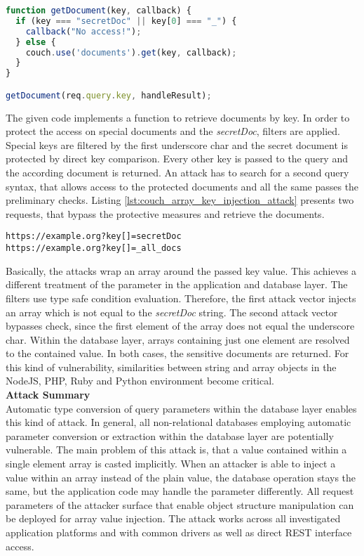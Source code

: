 \begin{lstlisting}[caption={Vulnerable NodeJS example for array key injection on CouchDB}, label={lst:couch_array_key_injection}, language=JavaScript]
function getDocument(key, callback) {
  if (key === "secretDoc" || key[0] === "_") {
    callback("No access!");
  } else {
    couch.use('documents').get(key, callback);
  }
}

getDocument(req.query.key, handleResult);
\end{lstlisting}

The given code implements a function to retrieve documents by key. In order to protect the access on special documents and the \emph{secretDoc}, filters are applied. Special keys are filtered by the first underscore char and the secret document is protected by direct key comparison. Every other key is passed to the query and the according document is returned. An attack has to search for a second query syntax, that allows access to the protected documents and all the same passes the preliminary checks. Listing \ref{lst:couch_array_key_injection_attack} presents two requests, that bypass the protective measures and retrieve the documents. \\

\begin{lstlisting}[caption={Attack vectors on CouchDB for array key injection via the query-string parameter}, label={lst:couch_array_key_injection_attack}]
https://example.org?key[]=secretDoc
https://example.org?key[]=_all_docs
\end{lstlisting}

Basically, the attacks wrap an array around the passed key value. This achieves a different treatment of the parameter in the application and database layer. The filters use type safe condition evaluation. Therefore, the first attack vector injects an array which is not equal to the \emph{secretDoc} string. The second attack vector bypasses check, since the first element of the array does not equal the underscore char. Within the database layer, arrays containing just one element are resolved to the contained value. In both cases, the sensitive documents are returned. For this kind of vulnerability, similarities between string and array objects in the NodeJS, PHP, Ruby and Python environment become critical. \\

\textbf{Attack Summary} \\
Automatic type conversion of query parameters within the database layer enables this kind of attack. In general, all non-relational databases employing automatic parameter conversion or extraction within the database layer are potentially vulnerable. The main problem of this attack is, that a value contained within a single element array is casted implicitly. When an attacker is able to inject a value within an array instead of the plain value, the database operation stays the same, but the application code may handle the parameter differently. All request parameters of the attacker surface that enable object structure manipulation can be deployed for array value injection. The attack works across all investigated application platforms and with common drivers as well as direct REST interface access. 


